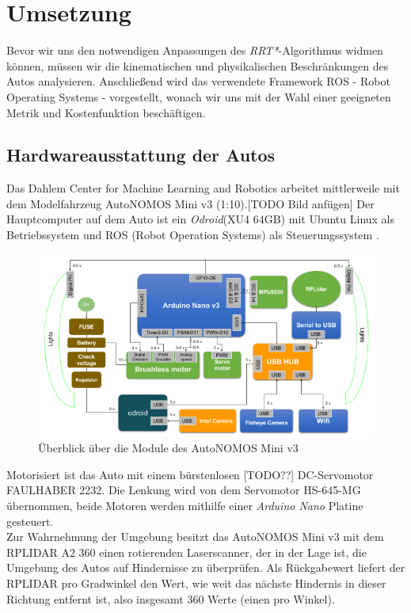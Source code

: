 \section{Umsetzung}
\label{sec:Umsetzung}
Bevor wir uns den notwendigen Anpassungen des \textit{RRT*}-Algorithmus widmen können, müssen wir die kinematischen und physikalischen Beschränkungen des Autos analysieren. Anschließend wird das verwendete Framework ROS - Robot Operating Systems - vorgestellt, wonach wir uns mit der Wahl einer geeigneten Metrik und Kostenfunktion beschäftigen.
\subsection{Hardwareausstattung der Autos}
Das Dahlem Center for Machine Learning and Robotics arbeitet mittlerweile mit dem Modelfahrzeug AutoNOMOS Mini v3 (1:10).[TODO Bild anfügen] Der Hauptcomputer auf dem Auto ist ein \textit{Odroid}(XU4 64GB) mit Ubuntu Linux als Betriebssystem und ROS (Robot Operation Systems) als Steuerungssystem \citep{fubAuto}.\\
\begin{figure}
\centering
\includegraphics[scale=0.8]{Bilder/AutoNOMOS_mini_v3.png} 
\caption{Überblick über die Module des AutoNOMOS Mini v3}
\end{figure}
Motorisiert ist das Auto mit einem bürstenlosen [TODO??] DC-Servomotor FAULHABER 2232. Die Lenkung wird von dem Servomotor HS-645-MG übernommen, beide Motoren werden mithilfe einer \textit{Arduino Nano} Platine gesteuert. \\
Zur Wahrnehmung der Umgebung besitzt das AutoNOMOS Mini v3 mit dem RPLIDAR A2 360 einen rotierenden Laserscanner, der in der Lage ist, die Umgebung des Autos auf Hindernisse zu überprüfen. Als Rückgabewert liefert der RPLIDAR pro Gradwinkel den Wert, wie weit das nächste Hindernis in dieser Richtung entfernt ist, also insgesamt 360 Werte (einen pro Winkel). \\
